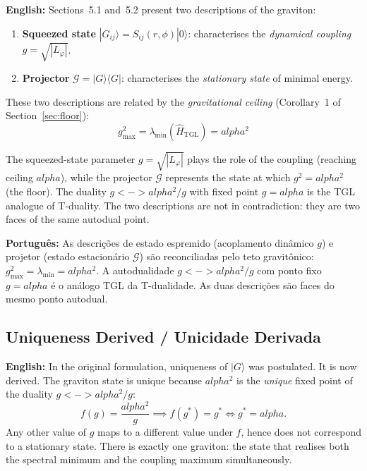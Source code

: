 \documentclass[12pt,a4paper]{article}
\def\leftrightarrow{ <-> }%
\def\alpha{alpha}%
\begin{document}
\textbf{English:} Sections~5.1 and~5.2 present two descriptions of the graviton:
\begin{enumerate}
    \item \textbf{Squeezed state} $|G_{ij}\rangle = S_{ij}(r,\phi)|0\rangle$: characterises the \emph{dynamical coupling} $g = \sqrt{|L_\varphi|}$.
    \item \textbf{Projector} $\mathcal{G} = |G\rangle\langle G|$: characterises the \emph{stationary state} of minimal energy.
\end{enumerate}

These two descriptions are related by the \emph{gravitational ceiling} (Corollary~1 of Section~\ref{sec:floor}):
\begin{equation}
\boxed{g_{\max}^2 = \lambda_{\min}(\hat{H}_{\text{TGL}}) = \alpha^2}
\end{equation}

The squeezed-state parameter $g = \sqrt{|L_\varphi|}$ plays the role of the coupling (reaching ceiling $\alpha$), while the projector $\mathcal{G}$ represents the state at which $g^2 = \alpha^2$ (the floor). The duality $g \leftrightarrow \alpha^2/g$ with fixed point $g = \alpha$ is the TGL analogue of T-duality. The two descriptions are not in contradiction: they are two faces of the same autodual point.

\textbf{Português:} As descrições de estado espremido (acoplamento dinâmico $g$) e projetor (estado estacionário $\mathcal{G}$) são reconciliadas pelo teto gravitônico: $g_{\max}^2 = \lambda_{\min} = \alpha^2$. A autodualidade $g \leftrightarrow \alpha^2/g$ com ponto fixo $g = \alpha$ é o análogo TGL da T-dualidade. As duas descrições são faces do mesmo ponto autodual.

\subsection{Uniqueness Derived / Unicidade Derivada}
\label{subsec:unique}

\textbf{English:} In the original formulation, uniqueness of $|G\rangle$ was postulated. It is now derived. The graviton state is unique because $\alpha^2$ is the \emph{unique} fixed point of the duality $g \leftrightarrow \alpha^2/g$:
\begin{equation}
f(g) = \frac{\alpha^2}{g} \implies f(g^*) = g^* \iff g^* = \alpha.
\end{equation}
Any other value of $g$ maps to a different value under $f$, hence does not correspond to a stationary state. There is exactly one graviton: the state that realises both the spectral minimum and the coupling maximum simultaneously.
\end{document}
